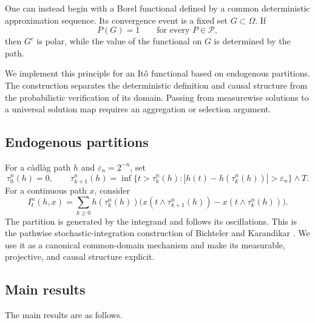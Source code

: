 \documentclass[11pt,reqno]{amsart}
\theoremstyle{plain}
\theoremstyle{definition}
\newcommand{\cP}{\mathcal P}
\newcommand{\eps}{\varepsilon}
\newcommand{\abs}[1]{\left\lvert #1\right\rvert}
\begin{document}
One can instead begin with a Borel functional defined by a common
deterministic approximation sequence.  Its convergence event is a fixed set
\(G\subset\Omega\).  If
\[
  P(G)=1\qquad\text{for every }P\in\cP,
\]
then \(G^c\) is polar, while the value of the functional on \(G\) is
determined by the path.

We implement this principle for an It\^o functional based on endogenous
partitions.  The construction separates the deterministic definition and
causal structure from the probabilistic verification of its domain.
Passing from measurewise solutions to a universal solution map requires an
aggregation or selection argument.

\subsection{Endogenous partitions}

For a c\`adl\`ag path \(h\) and \(\eps_n=2^{-n}\), set
\[
  \tau_0^n(h)=0,\qquad
  \tau_{k+1}^n(h)
  =
  \inf\bigl\{t>\tau_k^n(h):
       \abs{h(t)-h(\tau_k^n(h))}>\eps_n\bigr\}\wedge T.
\]
For a continuous path \(x\), consider
\begin{equation}\label{eq:intro-sum}
  I_t^n(h,x)
  =
  \sum_{k\ge0}h(\tau_k^n(h))
  \bigl(
    x(t\wedge\tau_{k+1}^n(h))
    -
    x(t\wedge\tau_k^n(h))
  \bigr).
\end{equation}
The partition is generated by the integrand and follows its oscillations.
This is the pathwise stochastic-integration construction of Bichteler and
Karandikar \cite{Bichteler81,Karandikar95}.  We use it as a canonical
common-domain mechanism and make its measurable, projective, and causal
structure explicit.

\subsection{Main results}

The main results are as follows.
\end{document}
